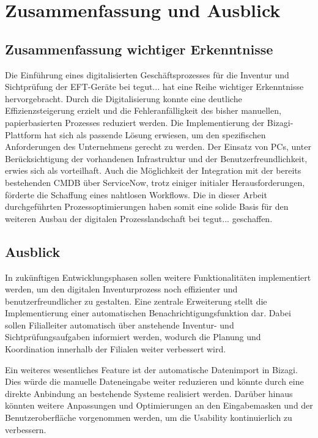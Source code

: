 \documentclass[12pt, a4paper]{article}
\begin{document}
\section{Zusammenfassung und Ausblick}

\subsection{Zusammenfassung wichtiger Erkenntnisse}
Die Einführung eines digitalisierten Geschäftsprozesses für die Inventur und Sichtprüfung der EFT-Geräte bei tegut... hat eine Reihe wichtiger Erkenntnisse hervorgebracht. 
Durch die Digitalisierung konnte eine deutliche Effizienzsteigerung erzielt und die Fehleranfälligkeit des bisher manuellen, papierbasierten Prozesses reduziert werden. 
Die Implementierung der Bizagi-Plattform hat sich als passende Lösung erwiesen, um den spezifischen Anforderungen des Unternehmens gerecht zu werden. Der Einsatz von PCs, 
unter Berücksichtigung der vorhandenen Infrastruktur und der Benutzerfreundlichkeit, erwies sich als vorteilhaft. Auch die Möglichkeit der Integration mit der bereits 
bestehenden CMDB über ServiceNow, trotz einiger initialer Herausforderungen, förderte die Schaffung eines nahtlosen Workflows. Die in dieser Arbeit durchgeführten 
Prozessoptimierungen haben somit eine solide Basis für den weiteren Ausbau der digitalen Prozesslandschaft bei tegut... geschaffen.

\subsection{Ausblick}
In zukünftigen Entwicklungsphasen sollen weitere Funktionalitäten implementiert werden, um den digitalen Inventurprozess noch effizienter und benutzerfreundlicher zu gestalten. 
Eine zentrale Erweiterung stellt die Implementierung einer automatischen Benachrichtigungsfunktion dar. Dabei sollen Filialleiter automatisch über anstehende Inventur- und 
Sichtprüfungsaufgaben informiert werden, wodurch die Planung und Koordination innerhalb der Filialen weiter verbessert wird. 

Ein weiteres wesentliches Feature ist der automatische Datenimport in Bizagi. Dies würde die manuelle Dateneingabe weiter reduzieren und könnte durch eine direkte 
Anbindung an bestehende Systeme realisiert werden. Darüber hinaus könnten weitere Anpassungen und Optimierungen an den Eingabemasken und der Benutzeroberfläche vorgenommen 
werden, um die Usability kontinuierlich zu verbessern.
\end{document}
